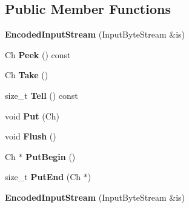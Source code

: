 \subsection*{Public Member Functions}
\begin{DoxyCompactItemize}
\item 
{\bfseries Encoded\+Input\+Stream} (Input\+Byte\+Stream \&is)\hypertarget{class_encoded_input_stream_a17f8e629500f6ae71cb72d1d63bf41fd}{}\label{class_encoded_input_stream_a17f8e629500f6ae71cb72d1d63bf41fd}

\item 
Ch {\bfseries Peek} () const \hypertarget{class_encoded_input_stream_abda3b0c141254343f4c481f67d52b423}{}\label{class_encoded_input_stream_abda3b0c141254343f4c481f67d52b423}

\item 
Ch {\bfseries Take} ()\hypertarget{class_encoded_input_stream_ab42cd57581bf62e42af471583e5b8377}{}\label{class_encoded_input_stream_ab42cd57581bf62e42af471583e5b8377}

\item 
size\+\_\+t {\bfseries Tell} () const \hypertarget{class_encoded_input_stream_a34cdb99fd81cd211f71903348e9c986f}{}\label{class_encoded_input_stream_a34cdb99fd81cd211f71903348e9c986f}

\item 
void {\bfseries Put} (Ch)\hypertarget{class_encoded_input_stream_afea36b666a44bd4adeabfcab7b68a322}{}\label{class_encoded_input_stream_afea36b666a44bd4adeabfcab7b68a322}

\item 
void {\bfseries Flush} ()\hypertarget{class_encoded_input_stream_aa4415bf4b97dd01e8c3de0ad7a161724}{}\label{class_encoded_input_stream_aa4415bf4b97dd01e8c3de0ad7a161724}

\item 
Ch $\ast$ {\bfseries Put\+Begin} ()\hypertarget{class_encoded_input_stream_ad97f7a549a8622c61b7fb2c63fedd69b}{}\label{class_encoded_input_stream_ad97f7a549a8622c61b7fb2c63fedd69b}

\item 
size\+\_\+t {\bfseries Put\+End} (Ch $\ast$)\hypertarget{class_encoded_input_stream_a83fe5ed281413d6005d1b324730e8bed}{}\label{class_encoded_input_stream_a83fe5ed281413d6005d1b324730e8bed}

\item 
{\bfseries Encoded\+Input\+Stream} (Input\+Byte\+Stream \&is)\hypertarget{class_encoded_input_stream_a17f8e629500f6ae71cb72d1d63bf41fd}{}\label{class_encoded_input_stream_a17f8e629500f6ae71cb72d1d63bf41fd}


\end{DoxyCompactItemize}
